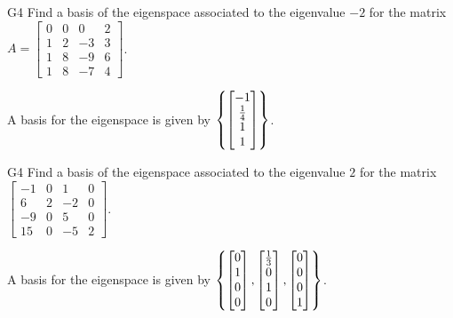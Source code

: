 \begin{problem}{G4}
Find a basis of the eigenspace associated to the eigenvalue \(-2\) for the matrix 
\(A=\begin{bmatrix}0 & 0 & 0 & 2 \\ 1 & 2 & -3 & 3 \\ 1 & 8 & -9 & 6 \\ 1 & 8 & -7 & 4\end{bmatrix}\).
\end{problem}
\begin{solution}
A basis for the eigenspace is given by \(\left\{\begin{bmatrix} -1 \\ \frac{1}{4} \\ 1 \\ 1 \end{bmatrix}\right\}\).
\end{solution}


\begin{problem}{G4}
Find a basis of the eigenspace associated to the eigenvalue \(2\) for the matrix 
\(\begin{bmatrix} -1 & 0 & 1 & 0 \\ 6 & 2 & -2 & 0 \\ -9 & 0 & 5 & 0 \\ 15 & 0 & -5 & 2 \end{bmatrix}\).
\end{problem}

\begin{solution}
A basis for the eigenspace is given by 
\(\left\{\begin{bmatrix}0 \\ 1 \\ 0 \\ 0\end{bmatrix},\begin{bmatrix} \frac{1}{3} \\ 0 \\ 1 \\ 0 \end{bmatrix}, \begin{bmatrix} 0 \\ 0 \\ 0 \\ 1\end{bmatrix}\right\}\).
\end{solution}
